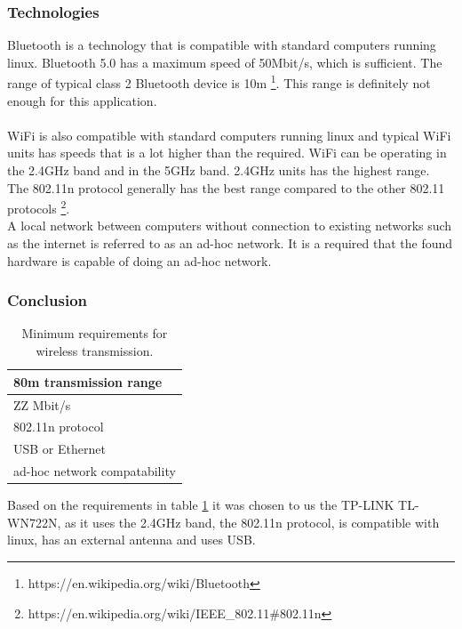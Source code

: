 \subsubsection{Technologies}
Bluetooth is a technology that is compatible with standard computers running linux. 
Bluetooth 5.0 has a maximum speed of 50Mbit/s, which is sufficient.
The range of typical class 2 Bluetooth device is 10m \footnote{https://en.wikipedia.org/wiki/Bluetooth}.
This range is definitely not enough for this application.
\\
\\  
WiFi is also compatible with standard computers running linux and typical WiFi units has speeds that is a lot higher than the required. 
WiFi can be operating in the 2.4GHz band and in the 5GHz band. 
2.4GHz units has the highest range. 
The 802.11n protocol generally has the best range compared to the other 802.11 protocols \footnote{https://en.wikipedia.org/wiki/IEEE\_802.11\#802.11n}.
\\
A local network between computers without connection to existing networks such as the internet is referred to as an ad-hoc network. 
It is a required that the found hardware is capable of doing an ad-hoc network.

\subsubsection{Conclusion} 

\begin{table}[]
\centering
\caption{Minimum requirements for wireless transmission.}
\label{tab:req_wifi}
\begin{tabular}{|l|}
\hline
80m transmission range       \\ \hline
ZZ Mbit/s                    \\ \hline
802.11n protocol             \\ \hline
USB or Ethernet              \\ \hline
ad-hoc network compatability \\ \hline
\end{tabular}
\end{table}
Based on the requirements in table \ref{tab:req_wifi} it was chosen to us the TP-LINK TL-WN722N, as it uses the 2.4GHz band, the 802.11n protocol, is compatible with linux, has an external antenna and uses USB. 























